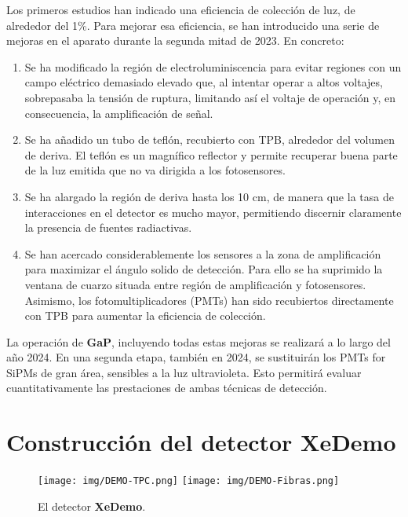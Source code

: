 \documentclass[12pt,a4paper,article]{report} %
\def\xed{{\bf XeDemo}}
\def\gap{{\bf GaP}}
\begin{document}
Los primeros estudios han indicado una eficiencia de colección de luz, de alrededor del 1\%. Para mejorar esa eficiencia, se han introducido una serie de mejoras en el aparato durante la segunda mitad de 2023. En concreto:
\begin{enumerate}
\item Se ha modificado la región de electroluminiscencia para evitar regiones con un campo eléctrico demasiado elevado que, al intentar operar a altos voltajes, sobrepasaba la tensión de ruptura, limitando así el voltaje de operación y, en consecuencia, la amplificación de señal.
\item Se ha añadido un tubo de teflón, recubierto con TPB, alrededor del volumen de deriva. El teflón es un magnífico reflector y permite recuperar buena parte de la luz emitida que no va dirigida a los fotosensores.
\item Se ha alargado la región de deriva hasta los 10 cm, de manera que la tasa de interacciones en el detector es mucho mayor, permitiendo discernir claramente la presencia de fuentes radiactivas.
\item Se han acercado considerablemente los sensores a la zona de amplificación para maximizar el ángulo solido de detección. Para ello se ha suprimido la ventana de cuarzo situada entre región de amplificación y fotosensores. Asimismo, los fotomultiplicadores (PMTs) han sido recubiertos directamente con TPB para aumentar la eficiencia de colección.
\end{enumerate}

La operación de \gap, incluyendo todas estas mejoras se realizará a lo largo 
del año 2024. En una segunda etapa, también en 2024, se sustituirán los PMTs for SiPMs de gran área, sensibles a la luz ultravioleta. Esto permitirá evaluar cuantitativamente las prestaciones de ambas técnicas de detección. 



\section*{Construcción del detector \xed}

\begin{figure}[htbp]
\begin{center}
\texttt{[image: img/DEMO-TPC.png]}
\texttt{[image: img/DEMO-Fibras.png]}
\caption{El detector \xed.}
\label{fig:Xe-DEMO}
\end{center}
\end{figure}
\end{document}
